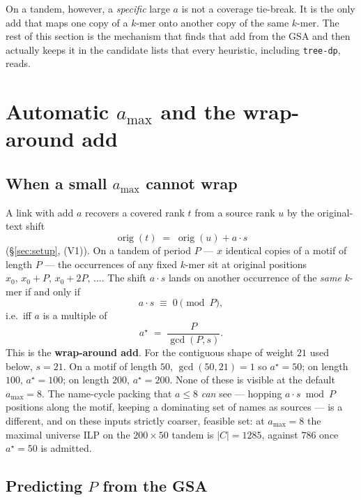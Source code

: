\documentclass[11pt,a4paper]{article}
\theoremstyle{definition}
\theoremstyle{plain}
\theoremstyle{remark}
\newcommand{\orig}{\operatorname{orig}}
\begin{document}
On a tandem, however, a \emph{specific} large $a$ is not a coverage
tie-break. It is the only add that maps one copy of a $k$-mer onto
another copy of the same $k$-mer. The rest of this section is the
mechanism that finds that add from the GSA and then actually keeps it
in the candidate lists that every heuristic, including
\texttt{tree-dp}, reads.

\section{Automatic $a_{\max}$ and the wrap-around add}
\label{sec:auto-max-add}

\subsection{When a small $a_{\max}$ cannot wrap}

A link with add $a$ recovers a covered rank $t$ from a source rank $u$
by the original-text shift
\[
  \orig(t) \;=\; \orig(u) + a\cdot s
\]
(\S\ref{sec:setup}, (V1)). On a tandem of period $P$ --- $x$ identical
copies of a motif of length $P$ --- the occurrences of any fixed
$k$-mer sit at original positions $x_0,\, x_0+P,\, x_0+2P,\,\dots$.
The shift $a\cdot s$ lands on another occurrence of the \emph{same}
$k$-mer if and only if
\begin{equation}
\label{eq:wrap}
  a\cdot s \;\equiv\; 0 \pmod{P},
\end{equation}
i.e.\ iff $a$ is a multiple of
\begin{equation}
\label{eq:astar}
  a^\star \;=\; \frac{P}{\gcd(P,s)}.
\end{equation}
This is the \textbf{wrap-around add}. For the contiguous shape of
weight $21$ used below, $s=21$. On a motif of length $50$,
$\gcd(50,21)=1$ so $a^\star=50$; on length $100$, $a^\star=100$; on
length $200$, $a^\star=200$. None of these is visible at the default
$a_{\max}=8$. The name-cycle packing that $a\le 8$ \emph{can} see ---
hopping $a\cdot s \bmod P$ positions along the motif, keeping a
dominating set of names as sources --- is a different, and on these
inputs strictly coarser, feasible set: at $a_{\max}=8$ the maximal
universe ILP on the $200\times 50$ tandem is $|C|=1285$, against $786$
once $a^\star=50$ is admitted.

\subsection{Predicting $P$ from the GSA}
\end{document}
